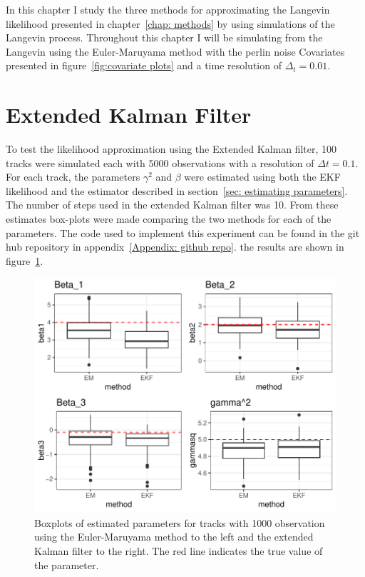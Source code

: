 


In this chapter I study the three methods for approximating the Langevin likelihood presented in chapter~\ref{chap: methods} by using simulations of the Langevin process. Throughout this chapter I will be simulating from the Langevin using the Euler-Maruyama method with the perlin noise Covariates presented in figure~\ref{fig:covariate plots} and a time resolution of $\Delta_t =0.01$.




\section{Extended Kalman Filter}
\label{sec: EKF test}
To test the likelihood approximation using the Extended Kalman filter, 100 tracks were simulated each with 5000 observations with a resolution of $\Delta t = 0.1$. For each track, the parameters $\gamma^2$ and $\beta$ were estimated using both the EKF likelihood and the estimator described in section~\ref{sec: estimating parameters}. The number of steps used in the extended Kalman filter was 10. From these estimates box-plots were made comparing the two methods for each of the parameters. The code used to implement this experiment can be found in the git hub repository in appendix~\ref{Appendix: github repo}. the results are shown in figure~\ref{fig:EKF_thin_boxplot}.

 

\begin{figure}[H]
    \centering
    \includegraphics[width=\linewidth]{Images/Results/EM VS EKF boxplots.pdf}
    \caption[example 1 covariates]{Boxplots of estimated parameters for tracks with 1000 observation using the Euler-Maruyama method to the left and the extended Kalman filter to the right. The red line indicates the true value of the parameter.}
    \label{fig:EKF_thin_boxplot}
\end{figure}

